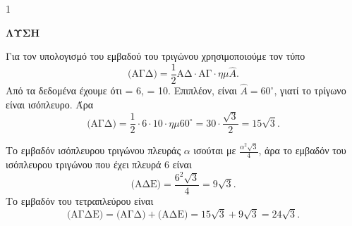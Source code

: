 \begin{ylh}{1}
    \item [Ύλη από εικόνα]
\end{ylh}
\textbf{ΛΥΣΗ}

\begin{alist}
    \item Για τον υπολογισμό του εμβαδού του τριγώνου  χρησιμοποιούμε τον τύπο
    \[ \text{(ΑΓΔ)} = \frac{1}{2} \text{ΑΔ} \cdot \text{ΑΓ} \cdot \eta\mu\hat{A}. \]
    Από τα δεδομένα έχουμε ότι  = 6,  = 10. Επιπλέον, είναι $\hat{A} = 60^\circ$, γιατί το τρίγωνο  είναι ισόπλευρο. Άρα
    \[ \text{(ΑΓΔ)} = \frac{1}{2} \cdot 6 \cdot 10 \cdot \eta\mu60^\circ = 30 \cdot \frac{\sqrt{3}}{2} = 15\sqrt{3}. \]
    \item Το εμβαδόν ισόπλευρου τριγώνου πλευράς $\alpha$ ισούται με $\frac{\alpha^2\sqrt{3}}{4}$, άρα το εμβαδόν του
    ισόπλευρου τριγώνου  που έχει πλευρά 6 είναι
    \[ \text{(ΑΔΕ)} = \frac{6^2\sqrt{3}}{4} = 9\sqrt{3}. \]
    Το εμβαδόν του τετραπλεύρου  είναι
    \[ \text{(ΑΓΔΕ)} = \text{(ΑΓΔ)} + \text{(ΑΔΕ)} = 15\sqrt{3} + 9\sqrt{3} = 24\sqrt{3}. \]
\end{alist}